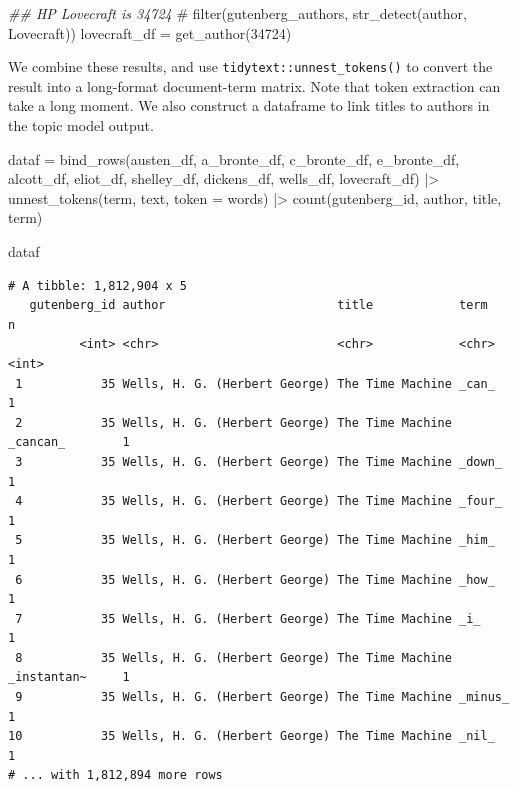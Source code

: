 \documentclass[
]{article}
\newenvironment{Shaded}{\begin{snugshade}}{\end{snugshade}}
\newcommand{\AttributeTok}[1]{\textcolor[rgb]{0.40,0.45,0.13}{#1}}
\newcommand{\CommentTok}[1]{\textcolor[rgb]{0.37,0.37,0.37}{#1}}
\newcommand{\DecValTok}[1]{\textcolor[rgb]{0.68,0.00,0.00}{#1}}
\newcommand{\DocumentationTok}[1]{\textcolor[rgb]{0.37,0.37,0.37}{\textit{#1}}}
\newcommand{\FunctionTok}[1]{\textcolor[rgb]{0.28,0.35,0.67}{#1}}
\newcommand{\NormalTok}[1]{\textcolor[rgb]{0.00,0.23,0.31}{#1}}
\newcommand{\OtherTok}[1]{\textcolor[rgb]{0.00,0.23,0.31}{#1}}
\newcommand{\SpecialCharTok}[1]{\textcolor[rgb]{0.37,0.37,0.37}{#1}}
\newcommand{\StringTok}[1]{\textcolor[rgb]{0.13,0.47,0.30}{#1}}
\begin{document}
\begin{Shaded}
\begin{Highlighting}[]
\DocumentationTok{\#\# HP Lovecraft is 34724}
\CommentTok{\# filter(gutenberg\_authors, str\_detect(author, \textquotesingle{}Lovecraft\textquotesingle{}))}
\NormalTok{lovecraft\_df }\OtherTok{=} \FunctionTok{get\_author}\NormalTok{(}\DecValTok{34724}\NormalTok{)}
\end{Highlighting}
\end{Shaded}

We combine these results, and use \texttt{tidytext::unnest\_tokens()} to
convert the result into a long-format document-term matrix. Note that
token extraction can take a long moment. We also construct a dataframe
to link titles to authors in the topic model output.

\begin{Shaded}
\begin{Highlighting}[]
\NormalTok{dataf }\OtherTok{=} \FunctionTok{bind\_rows}\NormalTok{(austen\_df, }
\NormalTok{                  a\_bronte\_df, }
\NormalTok{                  c\_bronte\_df, }
\NormalTok{                  e\_bronte\_df, }
\NormalTok{                  alcott\_df, }
\NormalTok{                  eliot\_df,}
\NormalTok{                  shelley\_df,}
\NormalTok{                  dickens\_df, }
\NormalTok{                  wells\_df, }
\NormalTok{                  lovecraft\_df) }\SpecialCharTok{|\textgreater{}} 
    \FunctionTok{unnest\_tokens}\NormalTok{(term, text, }\AttributeTok{token =} \StringTok{\textquotesingle{}words\textquotesingle{}}\NormalTok{) }\SpecialCharTok{|\textgreater{}} 
    \FunctionTok{count}\NormalTok{(gutenberg\_id, author, title, term)}

\NormalTok{dataf}
\end{Highlighting}
\end{Shaded}

\begin{verbatim}
# A tibble: 1,812,904 x 5
   gutenberg_id author                        title            term            n
          <int> <chr>                         <chr>            <chr>       <int>
 1           35 Wells, H. G. (Herbert George) The Time Machine _can_           1
 2           35 Wells, H. G. (Herbert George) The Time Machine _cancan_        1
 3           35 Wells, H. G. (Herbert George) The Time Machine _down_          1
 4           35 Wells, H. G. (Herbert George) The Time Machine _four_          1
 5           35 Wells, H. G. (Herbert George) The Time Machine _him_           1
 6           35 Wells, H. G. (Herbert George) The Time Machine _how_           1
 7           35 Wells, H. G. (Herbert George) The Time Machine _i_             1
 8           35 Wells, H. G. (Herbert George) The Time Machine _instantan~     1
 9           35 Wells, H. G. (Herbert George) The Time Machine _minus_         1
10           35 Wells, H. G. (Herbert George) The Time Machine _nil_           1
# ... with 1,812,894 more rows
\end{verbatim}
\end{document}

